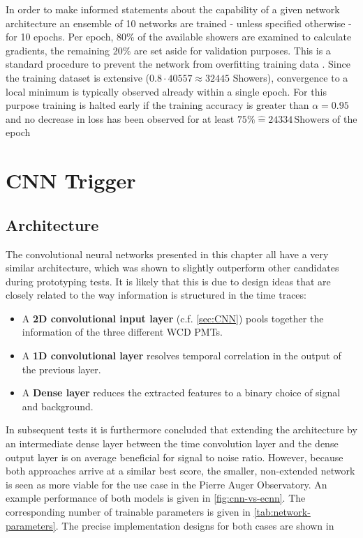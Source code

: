In order to make informed statements about the capability of a given network architecture an ensemble of 10 networks are trained - unless specified otherwise - for 
10 epochs. Per epoch, 80\% of the available showers are examined to calculate gradients, the remaining 20\% are set aside for validation purposes. This is a standard 
procedure to prevent the network from overfitting training data \cite{nasteski2017overview}. Since the training dataset is extensive ($0.8\cdot40557\approx32445$ 
Showers), convergence to a local minimum is typically observed already within a single epoch. For this purpose training is halted early if the training accuracy
is greater than $\alpha = 0.95$ and no decrease in loss has been observed for at least $75\% \hat{=} 24334\,\text{Showers}$ of the epoch

\section{CNN Trigger}
\label{sec:cnn-performance}

\subsection{Architecture}
\label{ssec:cnn-architecture}

The convolutional neural networks presented in this chapter all have a very similar architecture, which was shown to slightly outperform other candidates during 
prototyping tests. It is likely that this is due to design ideas that are closely related to the way information is structured in the time traces:

\begin{itemize}
	\item A \textbf{2D convolutional input layer} (c.f. \autoref{sec:CNN}) pools together the information of the three different WCD PMTs.
	\item A \textbf{1D convolutional layer} resolves temporal correlation in the output of the previous layer.
	\item A \textbf{Dense layer} reduces the extracted features to a binary choice of signal and background.
\end{itemize}

In subsequent tests it is furthermore concluded that extending the architecture by an intermediate dense layer between the time convolution layer and the dense 
output layer is on average beneficial for signal to noise ratio. However, because both approaches arrive at a similar best score, the smaller, non-extended network
is seen as more viable for the use case in the Pierre Auger Observatory. An example performance of both models is given in \autoref{fig:cnn-vs-ecnn}. The 
corresponding number of trainable parameters is given in \autoref{tab:network-parameters}. The precise implementation designs for both cases are shown in 

